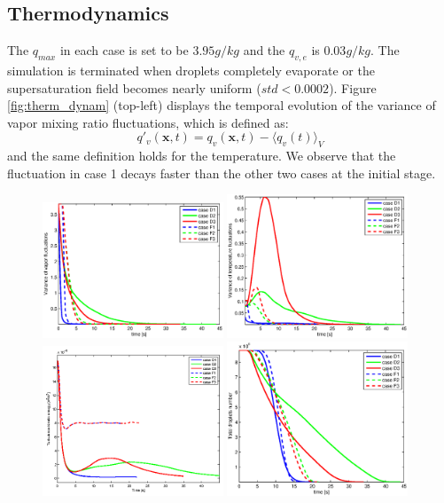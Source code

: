 \documentclass[12pt]{article}
\begin{document}
\subsection{Thermodynamics}
The $q_{max}$ in each case is set to be $3.95g/kg$ and the $q_{v,e}$ is $0.03g/kg$. The simulation is terminated when droplets completely evaporate or the supersaturation field becomes nearly uniform ($std<0.0002$). Figure \ref{fig:therm_dynam} (top-left) displays the temporal evolution of the variance of vapor mixing ratio fluctuations, which is defined as:
\[
q'_v(\mathbf{x},t) = q_v(\mathbf{x},t)-\langle q_v(t)\rangle_V
\]
and the same definition holds for the temperature. We observe that the fluctuation in case 1 decays faster than the other two cases at the initial stage. 
\begin{figure}[H]
\includegraphics[width=0.48\textwidth]{Figures/vap_var}
\includegraphics[width=0.48\textwidth]{Figures/temp_var}\\
\includegraphics[width=0.48\textwidth]{Figures/tke}
\includegraphics[width=0.48\textwidth]{Figures/num_tot}

\end{figure}
\end{document}
